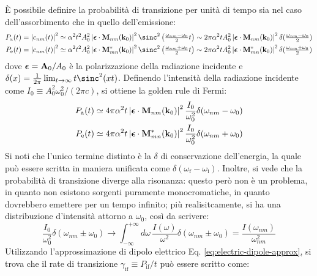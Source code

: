 È possibile definire la probabilità di transizione per unità di tempo sia nel caso dell'assorbimento che in quello dell'emissione:
\begin{align*}
	P_\text{a}(t) &= \abs{c_{nm}(t)}^2 \simeq \alpha^2 t^2 A_0^2 \abs{\bs{\epsilon} \cdot \ve{M}_{nm}(\ve{k}_0)}^2 \sinc^2 \left( \tfrac{\omega_{nm} - \omega_0}{2} t \right) \sim 2\pi \alpha^2 t A_0^2 \abs{\bs{\epsilon} \cdot \ve{M}_{nm}(\ve{k}_0)}^2 \delta(\tfrac{\omega_{nm} - \omega_0}{2}) \\
	P_\text{e}(t) &= \abs{c_{nm}(t)}^2 \simeq \alpha^2 t^2 A_0^2 \abs{\bs{\epsilon} \cdot \ve{M}_{mn}^*(\ve{k}_0)}^2 \sinc^2 \left( \tfrac{\omega_{nm} + \omega_0}{2} t \right) \sim 2\pi \alpha^2 t A_0^2 \abs{\bs{\epsilon} \cdot \ve{M}_{mn}^*(\ve{k}_0)}^2 \delta(\tfrac{\omega_{nm} + \omega_0}{2})
\end{align*}
dove $ \boldsymbol{\epsilon} = \mathbf{A}_0 / A_0 $ è la polarizzazione della radiazione incidente e $ \delta(x) = \frac{1}{2\pi} \lim_{t \rightarrow \infty} t \sinc^2(xt) $. Definendo l'intensità della radiazione incidente come $ I_0 \equiv A_0^2 \omega_0^2 / (2\pi c) $, si ottiene la golden rule di Fermi:
\begin{align*}
	P_\text{a}(t) &\simeq 4\pi \alpha^2 t \left\lvert\boldsymbol{\epsilon} \cdot \mathbf{M}_{nm}(\mathbf{k}_0)\right\rvert^2 \frac{I_0}{\omega_0^2} \delta(\omega_{nm} - \omega_0) \\
	P_\text{e}(t) &\simeq 4\pi \alpha^2 t \left\lvert\boldsymbol{\epsilon} \cdot \mathbf{M}_{mn}^*(\mathbf{k}_0)\right\rvert^2 \frac{I_0}{\omega_0^2} \delta(\omega_{nm} + \omega_0)
\end{align*}
Si noti che l'unico termine distinto è la $ \delta $ di conservazione dell'energia, la quale può essere scritta in maniera unificata come $ \delta(\omega_\text{f} - \omega_\text{i}) $. Inoltre, si vede che la probabilità di transizione diverge alla risonanza: questo però non è un problema, in quanto non esistono sorgenti puramente monocromatiche, in quanto dovrebbero emettere per un tempo infinito; più realisitcamente, si ha una distribuzione d'intensità attorno a $ \omega_0 $, così da scrivere:
\begin{equation*}
	\frac{I_0}{\omega_0^2} \delta(\omega_{nm} \pm \omega_0) \longrightarrow \int_{-\infty}^{+\infty} d\omega\, \frac{I(\omega)}{\omega^2} \delta(\omega_{nm} \pm \omega_0) = \frac{I(\omega_{nm})}{\omega_{nm}^2}
\end{equation*}
Utilizzando l'approssimazione di dipolo elettrico Eq. \ref{eq:electric-dipole-approx}, si trova che il rate di transizione $ \gamma_\text{if} \equiv P_\text{if} / t $ può essere scritto come:
